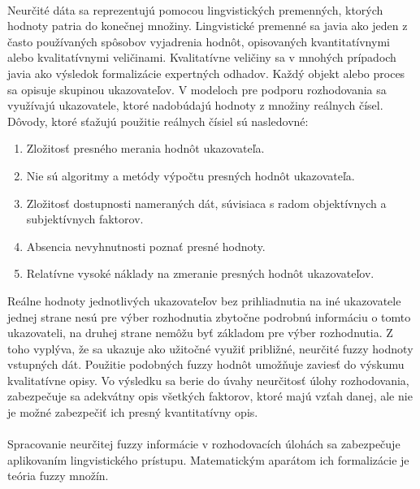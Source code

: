 \paragraph{}
Neurčité dáta sa reprezentujú pomocou lingvistických premenných, ktorých hodnoty patria do konečnej množiny. \cite{levashenkoProj}
Lingvistické premenné sa javia ako jeden z často používaných spôsobov vyjadrenia hodnôt, opisovaných kvantitatívnymi 
alebo kvalitatívnymi veličinami. Kvalitatívne veličiny sa v mnohých prípadoch javia ako výsledok formalizácie expertných odhadov. \cite{levashenkoProj}
Každý objekt alebo proces sa opisuje skupinou ukazovateľov. V modeloch pre podporu rozhodovania sa využívajú ukazovatele, ktoré nadobúdajú hodnoty z množiny reálnych čísel. 
Dôvody, ktoré sťažujú použitie reálnych čísiel sú nasledovné: \cite{levashenkoProj}
\begin{enumerate}
	\item Zložitosť presného merania hodnôt ukazovateľa. 
	\item Nie sú algoritmy a metódy výpočtu presných hodnôt ukazovateľa. 
	\item Zložitosť dostupnosti nameraných dát, súvisiaca s radom objektívnych a subjektívnych faktorov. 
	\item Absencia nevyhnutnosti poznať presné hodnoty. 
	\item Relatívne vysoké náklady na zmeranie presných hodnôt ukazovateľov. 
\end{enumerate}
Reálne hodnoty jednotlivých ukazovateľov bez prihliadnutia na iné ukazovatele jednej strane nesú pre výber rozhodnutia zbytočne podrobnú informáciu o tomto ukazovateli, na druhej strane nemôžu byť základom pre výber rozhodnutia. \cite{levashenkoProj}
Z toho vyplýva, že sa ukazuje ako užitočné využiť približné, neurčité fuzzy hodnoty vstupných dát. 
Použitie podobných fuzzy hodnôt umožňuje zaviesť do výskumu kvalitatívne opisy. Vo výsledku sa berie do úvahy neurčitosť úlohy rozhodovania, zabezpečuje sa adekvátny opis všetkých faktorov, ktoré majú vzťah danej, ale nie je možné zabezpečiť ich presný kvantitatívny opis. 
\paragraph*{}
Spracovanie neurčitej fuzzy informácie v rozhodovacích úlohách sa zabezpečuje aplikovaním lingvistického prístupu.\cite{levashenkoProj} %
Matematickým aparátom ich formalizácie je teória fuzzy množín. 


